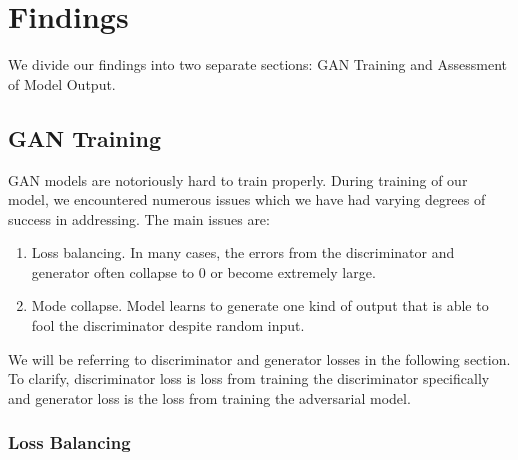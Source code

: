 \documentclass[12pt,oneside]{chicagocapstone}
\providecommand{\tightlist}{%
  \setlength{\itemsep}{0pt}\setlength{\parskip}{0pt}}
\begin{document}
\hypertarget{findings}{%
\chapter*{Findings}\label{findings}}

We divide our findings into two separate sections: GAN Training and Assessment of Model Output.

\hypertarget{findings-gan_training}{%
\section*{GAN Training}\label{findings-gan_training}}

GAN models are notoriously hard to train properly. During training of our model, we encountered numerous issues which we have had varying degrees of success in addressing. The main issues are:
\begin{enumerate}
\def\labelenumi{\arabic{enumi}.}
\tightlist
\item
  Loss balancing. In many cases, the errors from the discriminator and generator often collapse to 0 or become extremely large.
\item
  Mode collapse. Model learns to generate one kind of output that is able to fool the discriminator despite random input.
\end{enumerate}
We will be referring to discriminator and generator losses in the following section. To clarify, discriminator loss is loss from training the discriminator specifically and generator loss is the loss from training the adversarial model.

\hypertarget{loss-balancing}{%
\subsection*{Loss Balancing}\label{loss-balancing}}
\end{document}
